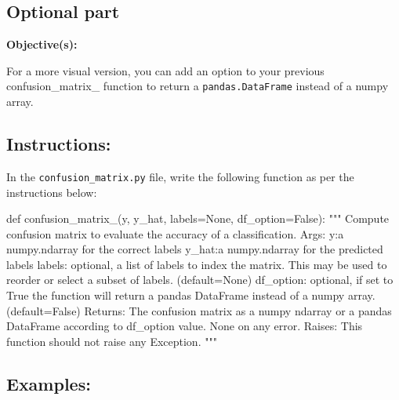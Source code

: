 \documentclass[]{article}
\newenvironment{Shaded}{\begin{snugshade}}{\end{snugshade}}
\newcommand{\CommentTok}[1]{\textcolor[rgb]{0.48,0.49,0.49}{#1}}
\newcommand{\KeywordTok}[1]{\textcolor[rgb]{0.81,0.81,0.76}{#1}}
\newcommand{\NormalTok}[1]{\textcolor[rgb]{0.81,0.81,0.76}{#1}}
\newcommand{\OperatorTok}[1]{\textcolor[rgb]{0.81,0.81,0.76}{#1}}
\newcommand{\VariableTok}[1]{\textcolor[rgb]{0.15,0.68,0.68}{#1}}
\begin{document}
\hypertarget{optional-part}{%
\subsection{Optional part}\label{optional-part}}

\textbf{Objective(s):}

For a more visual version, you can add an option to your previous
confusion\_matrix\_ function to return a \texttt{pandas.DataFrame}
instead of a numpy array.

\hypertarget{instructions-12}{%
\subsection{Instructions:}\label{instructions-12}}

In the \texttt{confusion\_matrix.py} file, write the following function
as per the instructions below:

\begin{Shaded}
\begin{Highlighting}[]
\KeywordTok{def}\NormalTok{ confusion_matrix_(y, y_hat, labels}\OperatorTok{=}\VariableTok{None}\NormalTok{, df_option}\OperatorTok{=}\VariableTok{False}\NormalTok{):}
    \CommentTok{"""}
\CommentTok{    Compute confusion matrix to evaluate the accuracy of a classification.}
\CommentTok{    Args:}
\CommentTok{        y:a numpy.ndarray for the correct labels}
\CommentTok{        y_hat:a numpy.ndarray for the predicted labels}
\CommentTok{        labels: optional, a list of labels to index the matrix. This may be used to reorder or select a subset of labels. (default=None)}
\CommentTok{        df_option: optional, if set to True the function will return a pandas DataFrame instead of a numpy array. (default=False)}
\CommentTok{    Returns: }
\CommentTok{        The confusion matrix as a numpy ndarray or a pandas DataFrame according to df_option value.}
\CommentTok{        None on any error.}
\CommentTok{    Raises:}
\CommentTok{        This function should not raise any Exception.}
\CommentTok{    """}
\end{Highlighting}
\end{Shaded}

\hypertarget{examples-11}{%
\subsection{Examples:}\label{examples-11}}
\end{document}
